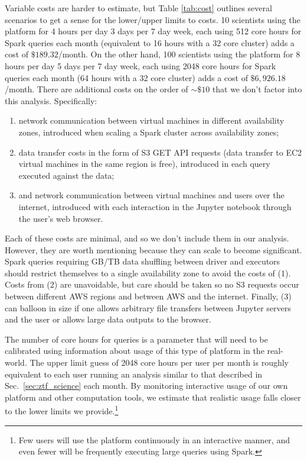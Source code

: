 \documentclass[twocolumn, linenumbers]{aastex631}
\begin{document}
Variable costs are harder to estimate, but Table \ref{tab:cost} outlines several scenarios to get a sense for the lower/upper limits to costs. 10 scientists using the platform for 4 hours per day 3 days per 7 day week, each using 512 core hours for Spark queries each month (equivalent to 16 hours with a 32 core cluster) adds a cost of $\$189.32$/month. On the other hand, 100 scientists using the platform for 8 hours per day 5 days per 7 day week, each using 2048 core hours for Spark queries each month (64 hours with a 32 core cluster) adds a cost of $\$6,926.18$/month. There are additional costs on the order of ${\sim} \$10$ that we don't factor into this analysis. Specifically:
\begin{enumerate}
    \item network communication between virtual machines in different availability zones, introduced when scaling a Spark cluster across availability zones;
    \item data transfer costs in the form of S3 GET API requests (data transfer to EC2 virtual machines in the same region is free), introduced in each query executed against the data;
    \item and network communication between virtual machines and users over the internet, introduced with each interaction in the Jupyter notebook through the user's web browser.
\end{enumerate}
Each of these costs are minimal, and so we don't include them in our analysis. However, they are worth mentioning because they can scale to become significant. Spark queries requiring GB/TB data shuffling between driver and executors should restrict themselves to a single availability zone to avoid the costs of (1). Costs from (2) are unavoidable, but care should be taken so no S3 requests occur between different AWS regions and between AWS and the internet. Finally, (3) can balloon in size if one allows arbitrary file transfers between Jupyter servers and the user or allows large data outputs to the browser.

The number of core hours for queries is a parameter that will need to be calibrated using information about usage of this type of platform in the real-world. The upper limit guess of 2048 core hours per user per month is roughly equivalent to each user running an analysis similar to that described in Sec.~\ref{sec:ztf_science} each month. By monitoring interactive usage of our own platform and other computation tools, we estimate that realistic usage falls closer to the lower limits we provide.\footnote{Few users will use the platform continuously in an interactive manner, and even fewer will be frequently executing large queries using Spark.}
\end{document}

